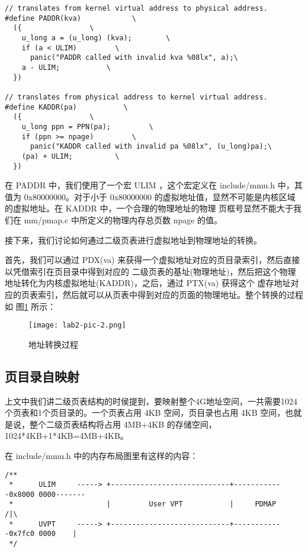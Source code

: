 \begin{verbatim}
// translates from kernel virtual address to physical address.
#define PADDR(kva)            \
  ({                \
    u_long a = (u_long) (kva);        \
    if (a < ULIM)         \
      panic("PADDR called with invalid kva %08lx", a);\
    a - ULIM;           \
  })

// translates from physical address to kernel virtual address.
#define KADDR(pa)           \
  ({                \
    u_long ppn = PPN(pa);         \
    if (ppn >= npage)         \
      panic("KADDR called with invalid pa %08lx", (u_long)pa);\
    (pa) + ULIM;          \
  })
\end{verbatim}

在 PADDR 中，我们使用了一个宏 ULIM ，这个宏定义在 include/mmu.h 中，其值为 0x80000000。对于小于
 0x80000000 的虚拟地址值，显然不可能是内核区域的虚拟地址。在 KADDR 中，一个合理的物理地址的物理
页框号显然不能大于我们在 mm/pmap.c 中所定义的物理内存总页数 npage 的值。

接下来，我们讨论如何通过二级页表进行虚拟地址到物理地址的转换。

首先，我们可以通过 PDX(va) 来获得一个虚拟地址对应的页目录索引，然后直接以凭借索引在页目录中得到对应的
二级页表的基址(物理地址)，然后把这个物理地址转化为内核虚拟地址(KADDR)，之后，通过 PTX(va) 获得这个
虚存地址对应的页表索引，然后就可以从页表中得到对应的页面的物理地址。整个转换的过程如 图\ref{lab2-pic-2.png}
所示：

\begin{figure}[htbp]
  \centering
  \texttt{[image: lab2-pic-2.png]}
  \caption{地址转换过程}\label{lab2-pic-2.png}
\end{figure}

\subsection{页目录自映射}

上文中我们讲二级页表结构的时侯提到，要映射整个4G地址空间，一共需要1024个页表和1个页目录的。一个页表占用 4KB
空间，页目录也占用 4KB 空间，也就是说，整个二级页表结构将占用 4MB+4KB 的存储空间，1024*4KB+1*4KB=4MB+4KB。

在 include/mmu.h 中的内存布局图里有这样的内容：

\begin{verbatim}
/**
 *      ULIM     -----> +----------------------------+------------0x8000 0000-------
 *                      |         User VPT           |     PDMAP                /|\
 *      UVPT     -----> +----------------------------+------------0x7fc0 0000    |
 */
\end{verbatim}

